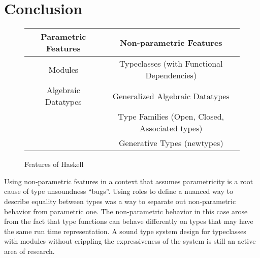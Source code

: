 \documentclass[manuscript,screen,nonacm]{acmart}
\begin{document}
\section{Conclusion}\label{sec:conclusion}

\begin{figure}[ht]
 \centering
 \begin{tabular}[ht]{c | c}
 Parametric Features & Non-parametric Features \\
 \hline
 Modules & Typeclasses (with Functional Dependencies)\\
 Algebraic Datatypes & Generalized Algebraic Datatypes\\
 & Type Families (Open, Closed, Associated types)\\
 & Generative Types (newtypes)
 \end{tabular}
 \caption{Features of Haskell}
 \label{fig:haskell-lang-features}
\end{figure}

Using non-parametric features in a context that assumes parametricity is a root cause of type unsoundness ``bugs''.
Using roles to define a nuanced way to describe equality between types was a way to separate out non-parametric behavior from parametric one. The non-parametric behavior in this case arose from the fact that type functions can behave differently on types that may have the same run time representation.
A sound type system design for typeclasses with modules without crippling the expressiveness of the system is still an active area of research.


\end{document}
